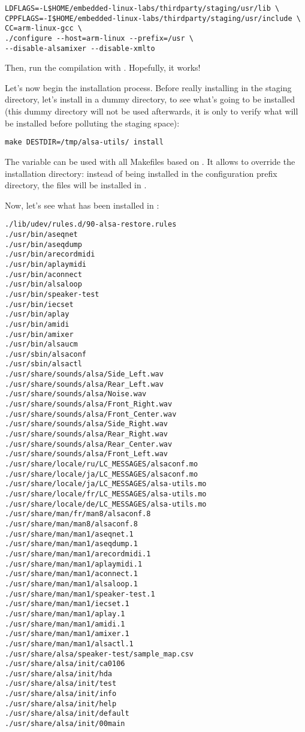 \begin{verbatim}
LDFLAGS=-L$HOME/embedded-linux-labs/thirdparty/staging/usr/lib \
CPPFLAGS=-I$HOME/embedded-linux-labs/thirdparty/staging/usr/include \
CC=arm-linux-gcc \
./configure --host=arm-linux --prefix=/usr \
--disable-alsamixer --disable-xmlto
\end{verbatim}

Then, run the compilation with \code{make}. Hopefully, it works!

Let's now begin the installation process.  Before really installing in
the staging directory, let's install in a dummy directory, to see
what's going to be installed (this dummy directory will not be used
afterwards, it is only to verify what will be installed before
polluting the staging space):

\begin{verbatim}
make DESTDIR=/tmp/alsa-utils/ install
\end{verbatim}

The  variable can be used with all Makefiles based on
\code{automake}. It allows to override the installation directory:
instead of being installed in the configuration prefix directory, the
files will be installed in .

Now, let's see what has been installed in \code{/tmp/alsa-utils/}:

\begin{verbatim}
./lib/udev/rules.d/90-alsa-restore.rules
./usr/bin/aseqnet
./usr/bin/aseqdump
./usr/bin/arecordmidi
./usr/bin/aplaymidi
./usr/bin/aconnect
./usr/bin/alsaloop
./usr/bin/speaker-test
./usr/bin/iecset
./usr/bin/aplay
./usr/bin/amidi
./usr/bin/amixer
./usr/bin/alsaucm
./usr/sbin/alsaconf
./usr/sbin/alsactl
./usr/share/sounds/alsa/Side_Left.wav
./usr/share/sounds/alsa/Rear_Left.wav
./usr/share/sounds/alsa/Noise.wav
./usr/share/sounds/alsa/Front_Right.wav
./usr/share/sounds/alsa/Front_Center.wav
./usr/share/sounds/alsa/Side_Right.wav
./usr/share/sounds/alsa/Rear_Right.wav
./usr/share/sounds/alsa/Rear_Center.wav
./usr/share/sounds/alsa/Front_Left.wav
./usr/share/locale/ru/LC_MESSAGES/alsaconf.mo
./usr/share/locale/ja/LC_MESSAGES/alsaconf.mo
./usr/share/locale/ja/LC_MESSAGES/alsa-utils.mo
./usr/share/locale/fr/LC_MESSAGES/alsa-utils.mo
./usr/share/locale/de/LC_MESSAGES/alsa-utils.mo
./usr/share/man/fr/man8/alsaconf.8
./usr/share/man/man8/alsaconf.8
./usr/share/man/man1/aseqnet.1
./usr/share/man/man1/aseqdump.1
./usr/share/man/man1/arecordmidi.1
./usr/share/man/man1/aplaymidi.1
./usr/share/man/man1/aconnect.1
./usr/share/man/man1/alsaloop.1
./usr/share/man/man1/speaker-test.1
./usr/share/man/man1/iecset.1
./usr/share/man/man1/aplay.1
./usr/share/man/man1/amidi.1
./usr/share/man/man1/amixer.1
./usr/share/man/man1/alsactl.1
./usr/share/alsa/speaker-test/sample_map.csv
./usr/share/alsa/init/ca0106
./usr/share/alsa/init/hda
./usr/share/alsa/init/test
./usr/share/alsa/init/info
./usr/share/alsa/init/help
./usr/share/alsa/init/default
./usr/share/alsa/init/00main
\end{verbatim}

